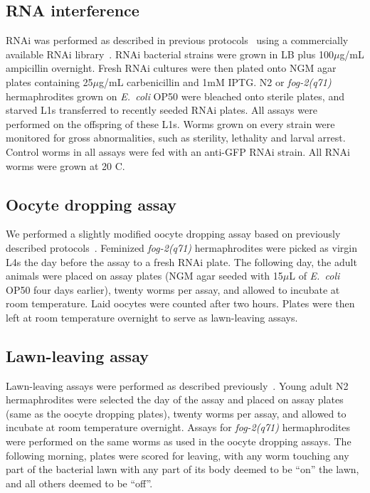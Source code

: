 \documentclass[9pt,twocolumn,twoside]{gsag3jnl}
\newcommand{\fog}{\emph{fog-2}}
\newcommand{\ecol}{\emph{E.~coli}}
\begin{document}
\subsection{RNA interference}
\label{sb:rnai}
RNAi was performed as described in previous protocols~\citep{Kamath2001} using a commercially available RNAi library~\citep{Kamath2003}. RNAi bacterial strains were grown in LB plus 100$\mu$g/mL ampicillin overnight. Fresh RNAi cultures were then plated onto NGM agar plates containing 25$\mu$g/mL carbenicillin and 1mM IPTG. N2 or \fog{}\emph{(q71)} hermaphrodites grown on \ecol{} OP50 were bleached onto sterile plates, and starved L1s transferred to recently seeded RNAi plates.
All assays were performed on the offspring of these L1s. Worms grown on every strain were monitored for gross abnormalities, such as sterility, lethality and larval arrest. Control worms in all assays were fed with an anti-GFP RNAi strain. All RNAi worms were grown at 20\degree{} C.

\subsection{Oocyte dropping assay}
\label{sb:oocyte_assay}
We performed a slightly modified oocyte dropping assay based on previously described protocols~\citep{White2012}. Feminized \fog{}\emph{(q71)} hermaphrodites were picked as virgin L4s the day before the assay to a fresh RNAi plate. The following day, the adult animals were placed on assay plates (NGM agar seeded with 15$\mu$L of \ecol{} OP50 four days earlier), twenty worms per assay, and allowed to incubate at room temperature. Laid oocytes were counted after two hours. Plates were then left at room temperature overnight to serve as lawn-leaving assays.

\subsection{Lawn-leaving assay}
\label{sb:lawn_leaving}
Lawn-leaving assays were performed as described previously~\citep{Lipton2004}. Young adult N2 hermaphrodites were selected the day of the assay and placed on assay plates (same as the oocyte dropping plates), twenty worms per assay, and allowed to incubate at room temperature overnight. Assays for \fog{}\emph{(q71)} hermaphrodites were performed on the same worms as used in the oocyte dropping assays. The following morning, plates were scored for leaving, with any worm touching any part of the bacterial lawn with any part of its body deemed to be “on” the lawn, and all others deemed to be “off”.
\end{document}
